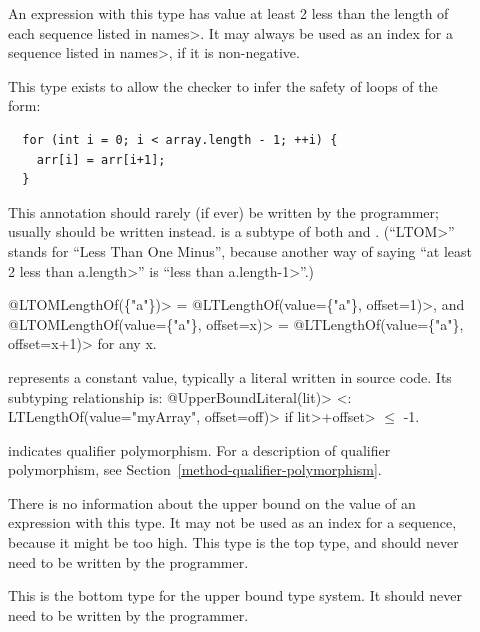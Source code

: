 \begin{description}
\item[]
  An expression with this type
  has value at least 2 less than the length of each sequence listed in \<names>.
  It may always be used as an index for a sequence listed in \<names>, if it is
  non-negative.

  This type exists to allow the checker to infer the safety of loops of
  the form:
\begin{Verbatim}
  for (int i = 0; i < array.length - 1; ++i) {
    arr[i] = arr[i+1];
  }
\end{Verbatim}
  This annotation should rarely (if ever) be written by the programmer; usually
  should be written instead.
   is a subtype of both
   and .
  (``\<LTOM>'' stands for ``Less Than One Minus'', because another way of
  saying ``at least 2 less than \<a.length>'' is ``less than \<a.length-1>''.)

  \<@LTOMLengthOf(\{"a"\})> = \<@LTLengthOf(value=\{"a"\}, offset=1)>, and \\
  \<@LTOMLengthOf(value=\{"a"\}, offset=x)> = \<@LTLengthOf(value=\{"a"\},
  offset=x+1)> for any x.

\item[]
  represents a constant value, typically a literal written in source code.
  Its subtyping relationship is:
  \<@UpperBoundLiteral(lit)> <: \<LTLengthOf(value="myArray", offset=off)>
  if \<lit>+\<offset> $\le$ -1.

\item[]
  indicates qualifier polymorphism.
  For a description of qualifier polymorphism, see
  Section~\ref{method-qualifier-polymorphism}.

\item[]
  There is no information about the upper bound on the value of an expression with this type.
  It may not be used as an index for a sequence, because it might be too high.
  This type is the top type, and should never need to be written by the
  programmer.

\item[]
  This is the bottom type for the upper bound type system. It should
  never need to be written by the programmer.

\end{description}

